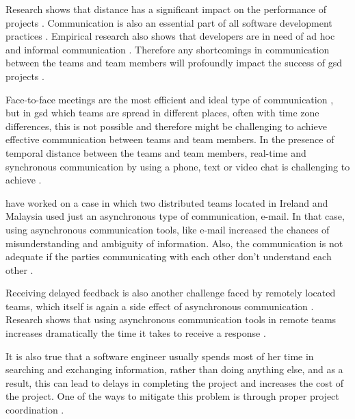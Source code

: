 Research shows that distance has a significant impact on the performance of projects \citep{damian2003global,Herbsleb2001a}. Communication is also an essential part of all software development practices \citep{layman2006essential}. Empirical research also shows that developers are in need of ad hoc and informal communication \citep{grinter1998recomposition,kraut1995coordination}. Therefore any shortcomings in communication between the teams and team members will profoundly impact the success of \ac{gsd} projects \citep{layman2006essential}.

Face-to-face meetings are the most efficient and ideal type of communication \citep{Kirkman2004}, but in \ac{gsd} which teams are spread in different places, often with time zone differences, this is not possible and therefore might be challenging to achieve effective communication between teams and team members. In the presence of temporal distance between the teams and team members, real-time and synchronous communication by using a phone, text or video chat is challenging to achieve \citep{holmstrom2006agile,kommeren2007philips}.

\citet{casey2008impact} have worked on a case in which two distributed teams located in Ireland and Malaysia used just an asynchronous type of communication, e-mail. In that case, using asynchronous communication tools, like e-mail increased the chances of misunderstanding and ambiguity of information. Also, the communication is not adequate if the parties communicating with each other don’t understand each other \citep{kommeren2007philips,cataldo2007coordination}.

Receiving delayed feedback is also another challenge faced by remotely located teams, which itself is again a side effect of asynchronous communication \citep{conchuir2006exploring,holmstrom2006agile}. Research shows that using asynchronous communication tools in remote teams increases dramatically the time it takes to receive a response \citep{holmstrom2006global}. 

It is also true that a software engineer usually spends most of her time in searching and exchanging information, rather than doing anything else, and as a result, this can lead to delays in completing the project and increases the cost of the project. One of the ways to mitigate this problem is through proper project coordination \citep{dumitriu2006issues}. 


